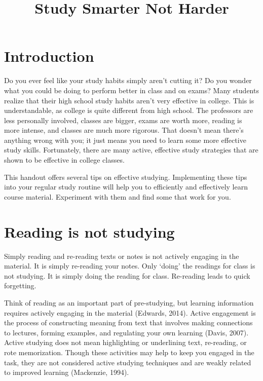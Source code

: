 \documentclass[../main.tex]{subfiles}
\title{Study Smarter Not Harder}
\begin{document}
\maketitle
%
\section{Introduction}
Do you ever feel like your study habits simply aren't cutting it? Do you wonder
what you could be doing to perform better in class and on exams? Many students
realize that their high school study habits aren't very effective in college.
This is understandable, as college is quite different from high school. The
professors are less personally involved, classes are bigger, exams are worth
more, reading is more intense, and classes are much more rigorous. That doesn't
mean there's anything wrong with you; it just means you need to learn some more
effective study skills. Fortunately, there are many active, effective study
strategies that are shown to be effective in college classes.

This handout offers several tips on effective studying. Implementing these tips
into your regular study routine will help you to efficiently and effectively
learn course material. Experiment with them and find some that work for you.
%
\section{Reading is not studying}
Simply reading and re-reading texts or notes is not actively engaging in the
material. It is simply re-reading your notes. Only ‘doing' the readings for
class is not studying. It is simply doing the reading for class. Re-reading
leads to quick forgetting.

Think of reading as an important part of pre-studying, but learning information
requires actively engaging in the material (Edwards, 2014). Active engagement is
the process of constructing meaning from text that involves making connections
to lectures, forming examples, and regulating your own learning (Davis, 2007).
Active studying does not mean highlighting or underlining text, re-reading, or
rote memorization. Though these activities may help to keep you engaged in the
task, they are not considered active studying techniques and are weakly related
to improved learning (Mackenzie, 1994).
\end{document}
